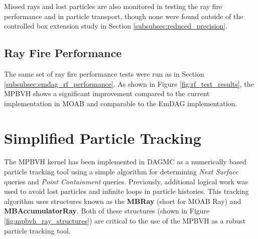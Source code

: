 Missed rays and lost particles are also monitored in testing the ray fire
performance and in particle transport, though none were found outside of the
controlled box extension study in Section \ref{subsubsec:reduced_precision}.

\subsection{Ray Fire Performance}\label{sec:mpbvh_rf_perf}

The same set of ray fire performance tests were run as in Section
\ref{subsubsec:emdag_rf_performance}. As shown in Figure
\ref{fig:rf_test_results}, the MPBVH shows a significant improvement compared to
the current implementation in MOAB and comparable to the EmDAG implementation.

\section{Simplified Particle Tracking}

The MPBVH kernel has been implemented in DAGMC as a numerically based particle
tracking tool using a simple algorithm for determining \textit{Next Surface}
queries and \textit{Point Containment} queries. Previously, additional logical
work was used to avoid lost particles and infinite loops in particle
histories. This tracking algorithm uses structures known as the \textbf{MBRay}
(short for MOAB Ray) and \textbf{MBAccumulatorRay}. Both of these structures
(shown in Figure \ref{fig:mpbvh_ray_structures}) are critical to the use of the
MPBVH as a robust particle tracking tool.

